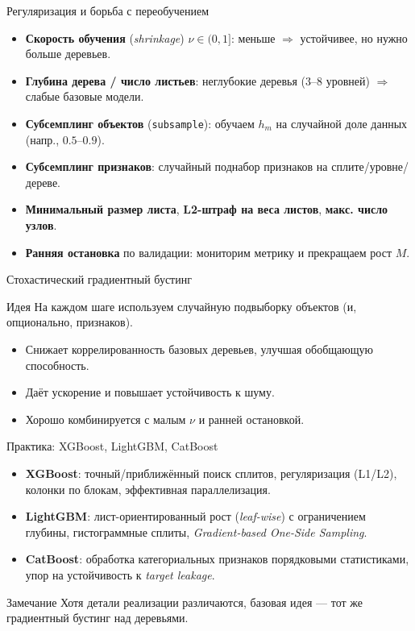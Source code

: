 \documentclass[aspectratio=169]{beamer}
\newcommand{\lr}{\nu} %
\begin{document}
\begin{frame}{Регуляризация и борьба с переобучением}
	\begin{itemize}
		\item \textbf{Скорость обучения} (\textit{shrinkage}) $\lr\in(0,1]$: меньше $\Rightarrow$ устойчивее, но нужно больше деревьев.
		\item \textbf{Глубина дерева / число листьев}: неглубокие деревья (3–8 уровней) $\Rightarrow$ слабые базовые модели.
		\item \textbf{Субсемплинг объектов} (\texttt{subsample}): обучаем $h_m$ на случайной доле данных (напр., $0.5$–$0.9$).
		\item \textbf{Субсемплинг признаков}: случайный поднабор признаков на сплите/уровне/дереве.
		\item \textbf{Минимальный размер листа}, \textbf{L2-штраф на веса листов}, \textbf{макс. число узлов}.
		\item \textbf{Ранняя остановка} по валидации: мониторим метрику и прекращаем рост $M$.
	\end{itemize}
\end{frame}

\begin{frame}{Стохастический градиентный бустинг}
	\begin{block}{Идея}
		На каждом шаге используем случайную подвыборку объектов (и, опционально, признаков).
	\end{block}
	\begin{itemize}
		\item Снижает коррелированность базовых деревьев, улучшая обобщающую способность.
		\item Даёт ускорение и повышает устойчивость к шуму.
		\item Хорошо комбинируется с малым $\lr$ и ранней остановкой.
	\end{itemize}
\end{frame}

\begin{frame}{Практика: XGBoost, LightGBM, CatBoost}
	\begin{itemize}
		\item \textbf{XGBoost}: точный/приближённый поиск сплитов, регуляризация (L1/L2), колонки по блокам, эффективная параллелизация.
		\item \textbf{LightGBM}: лист-ориентированный рост (\textit{leaf-wise}) с ограничением глубины, гистограммные сплиты, \textit{Gradient-based One-Side Sampling}.
		\item \textbf{CatBoost}: обработка категориальных признаков порядковыми статистиками, упор на устойчивость к \textit{target leakage}.
	\end{itemize}
	\begin{block}{Замечание}
		Хотя детали реализации различаются, базовая идея — тот же градиентный бустинг над деревьями.
	\end{block}
\end{frame}
\end{document}
